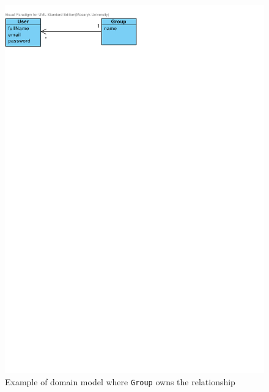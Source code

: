 \begin{figure}[h]
    \centering
        \includegraphics[trim=0 740 290 30, clip, keepaspectratio]{./images/user-group-owner-example.pdf}
    \caption{Example of domain model where \texttt{Group} owns the relationship}
    \label{fig:user-group-owner-example}
\end{figure}


